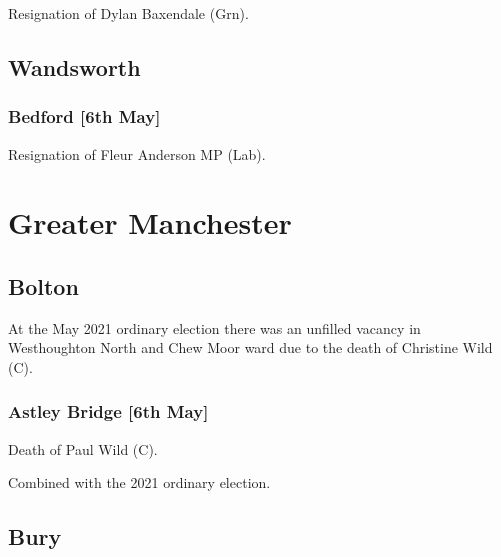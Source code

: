 \documentclass[a4paper,openany]{book}
\begin{document}
\begin{resultsiii}

Resignation of Dylan Baxendale (Grn).

\subsection*{Wandsworth}

\subsubsection*{Bedford \hspace*{\fill}\nolinebreak[1]%
	\enspace\hspace*{\fill}
	[6th May]}


Resignation of Fleur Anderson MP (Lab).

\section{Greater Manchester}

\subsection*{Bolton}

At the May 2021 ordinary election there was an unfilled vacancy in Westhoughton North and Chew Moor ward due to the death of Christine Wild (C).

\subsubsection*{Astley Bridge \hspace*{\fill}\nolinebreak[1]%
	\enspace\hspace*{\fill}
	[6th May]}


Death of Paul Wild (C).

Combined with the 2021 ordinary election.

\subsection*{Bury}


\end{resultsiii}
\end{document}
